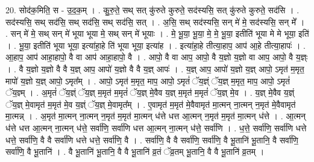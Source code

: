 \documentclass[17pt]{extarticle}
\begin{document}
20. सोद॑क॒मिति॒ स - उ॒द॒क॒म् । . कु॒रु॒ते॒ सथ् सत् कु॑रुते कुरुते॒ सद॑स्यसि॒ सत् कु॑रुते कुरुते॒ सद॑सि । . सद॑स्यसि॒ सथ् सद॑सि॒ सथ् सद॑सि॒ सथ् सद॑सि॒ सत् । . अ॒सि॒ सथ् सद॑स्यसि॒ सन् मे॑ मे॒ सद॑स्यसि॒ सन् मे᳚ । . सन् मे॑ मे॒ सथ् सन् मे॑ भूया भूया मे॒ सथ् सन् मे॑ भूयाः । . मे॒ भू॒या॒ भू॒या॒ मे॒ मे॒ भू॒या॒ इतीति॑ भूया मे मे भूया॒ इति॑ । . भू॒या॒ इतीति॑ भूया भूया॒ इत्या॑हा॒हे ति॑ भूया भूया॒ इत्या॑ह । . इत्या॑हा॒हे तीत्या॒हाप॒ आप॑ आ॒हे तीत्या॒हापः॑ । . आ॒हाप॒ आप॑ आहा॒हापो॒ वै वा आप॑ आहा॒हापो॒ वै । . आपो॒ वै वा आप॒ आपो॒ वै य॒ज्ञो य॒ज्ञो वा आप॒ आपो॒ वै य॒ज्ञ्ः । . वै य॒ज्ञो य॒ज्ञो वै वै य॒ज्ञ् आप॒ आपो॑ य॒ज्ञो वै वै य॒ज्ञ् आपः॑ । . य॒ज्ञ् आप॒ आपो॑ य॒ज्ञो य॒ज्ञ् आपो॒ ऽमृत॑ म॒मृत॒ मापो॑ य॒ज्ञो य॒ज्ञ् आपो॒ ऽमृत᳚म् । . आपो॒ ऽमृत॑ म॒मृत॒ माप॒ आपो॒ ऽमृतं॑ ॅय॒ज्ञ्ं ॅय॒ज्ञ् म॒मृत॒ माप॒ आपो॒ ऽमृतं॑ ॅय॒ज्ञ्म् । . अ॒मृतं॑ ॅय॒ज्ञ्ं ॅय॒ज्ञ् म॒मृत॑ म॒मृतं॑ ॅय॒ज्ञ् मे॒वैव य॒ज्ञ् म॒मृत॑ म॒मृतं॑ ॅय॒ज्ञ् मे॒व । . य॒ज्ञ् मे॒वैव य॒ज्ञ्ं ॅय॒ज्ञ् मे॒वामृत॑ म॒मृत॑ मे॒व य॒ज्ञ्ं ॅय॒ज्ञ् मे॒वामृत᳚म् । . ए॒वामृत॑ म॒मृत॑ मे॒वैवामृत॑ मा॒त्मन् ना॒त्मन् न॒मृत॑ मे॒वैवामृत॑ मा॒त्मन्न् । . अ॒मृत॑ मा॒त्मन् ना॒त्मन् न॒मृत॑ म॒मृत॑ मा॒त्मन् ध॑त्ते धत्त आ॒त्मन् न॒मृत॑ म॒मृत॑ मा॒त्मन् ध॑त्ते । . आ॒त्मन् ध॑त्ते धत्त आ॒त्मन् ना॒त्मन् ध॑त्ते॒ सर्वा॑णि॒ सर्वा॑णि धत्त आ॒त्मन् ना॒त्मन् ध॑त्ते॒ सर्वा॑णि । . ध॒त्ते॒ सर्वा॑णि॒ सर्वा॑णि धत्ते धत्ते॒ सर्वा॑णि॒ वै वै सर्वा॑णि धत्ते धत्ते॒ सर्वा॑णि॒ वै । . सर्वा॑णि॒ वै वै सर्वा॑णि॒ सर्वा॑णि॒ वै भू॒तानि॑ भू॒तानि॒ वै सर्वा॑णि॒ सर्वा॑णि॒ वै भू॒तानि॑ । . वै भू॒तानि॑ भू॒तानि॒ वै वै भू॒तानि॑ व्र॒तं ॅव्र॒तम् भू॒तानि॒ वै वै भू॒तानि॑ व्र॒तम् । \newline
\end{document}

